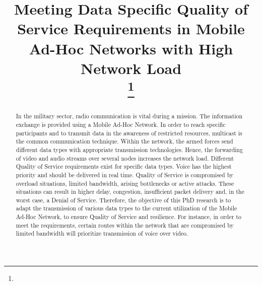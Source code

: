 \documentclass[conference]{IEEEtran}
\begin{document}
\title{Meeting Data Specific Quality of Service Requirements in Mobile Ad-Hoc Networks with High Network Load\\
	{\footnotesize \textsuperscript{}}
	\thanks{}
}

\author{
	\and
	\and
}

\maketitle         %

\begin{abstract}
 In the military sector, radio communication is vital during a mission. The information exchange is provided using a Mobile Ad-Hoc Network. In order to reach specific participants and to transmit data in the awareness of restricted resources, multicast is the common communication technique. Within the network, the armed forces send different data types with appropriate transmission technologies. Hence, the forwarding of video and audio streams over several nodes increases the network load. Different Quality of Service requirements exist for specific data types. Voice has the highest priority and should be delivered in real time. Quality of Service is compromised by overload situations, limited bandwidth, arising bottlenecks or active attacks. These situations can result in higher delay, congestion, insufficient packet delivery and, in the worst case, a Denial of Service. Therefore, the objective of this PhD research is to adapt the transmission of various data types to the current utilization of the Mobile Ad-Hoc Network, to ensure Quality of Service and resilience. For instance, in order to meet the requirements, certain routes within the network that are compromised by limited bandwidth will prioritize transmission of voice over video.

\end{abstract}
%
\end{document}
